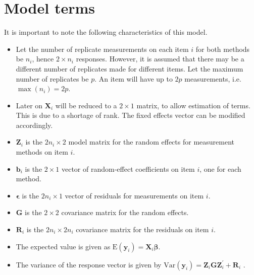 \documentclass[12pt, a4paper]{report}
\theoremstyle{plain}
\theoremstyle{definition}
\theoremstyle{remark}
\begin{document}
	\section{Model terms}
	It is important to note the following characteristics of this model.
	\begin{itemize}
		\item Let the number of replicate measurements on each item $i$ for both methods be $n_i$, hence $2 \times n_i$ responses. However, it is assumed that there may be a different number of replicates made for different items. Let the maximum number of replicates be $p$. An item will have up to $2p$ measurements, i.e. $\max(n_{i}) = 2p$.
		
		
		\item Later on $\boldsymbol{X}_i$ will be reduced to a $2 \times 1$ matrix, to allow estimation of terms. This is due to a shortage of rank. The fixed effects vector can be modified accordingly.
		\item $\boldsymbol{Z}_i$ is the $2n_i \times  2$ model matrix for the random effects for measurement methods on item $i$.
		\item $\boldsymbol{b}_i$ is the $2 \times  1$ vector of random-effect coefficients on item $i$, one for each method.
		\item $\boldsymbol{\epsilon}$  is the $2n_i \times  1$ vector of residuals for measurements on item $i$.
		\item $\boldsymbol{G}$ is the $2 \times  2$ covariance matrix for the random effects.
		\item $\boldsymbol{R}_i$ is the $2n_i \times  2n_i$ covariance matrix for the residuals on item $i$.
		\item The expected value is given as $\mbox{E}(\boldsymbol{y}_i) = \boldsymbol{X}_i\boldsymbol{\beta}.$ \citep{hamlett}
		\item The variance of the response vector is given by $\mbox{Var}(\boldsymbol{y}_i)  = \boldsymbol{Z}_i \boldsymbol{G} \boldsymbol{Z}_i^{\prime} + \boldsymbol{R}_i$ \citep{hamlett}.
	\end{itemize}
	
\end{document}
